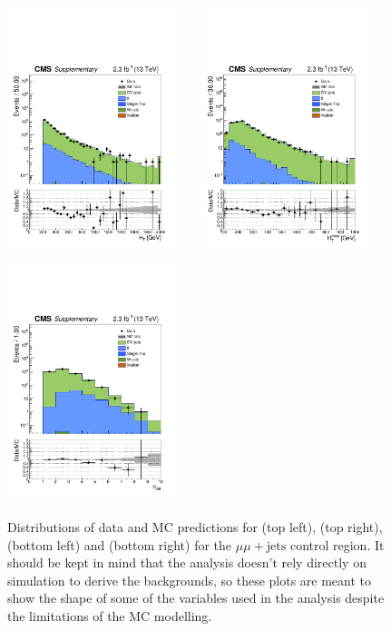 \clearpage
\begin{figure}[tbhp]
    \caption{ 
    Distributions of data and MC predictions for \scalht (top left), \mht (top right), \nj (bottom left) and \nb (bottom right) 
    for the $\mu\mu+\mathrm{jets}$ control region. 
    It should be kept in mind that the analysis doesn't rely directly on simulation to derive the backgrounds, 
    so these plots are meant to show the shape of some of the variables used in the analysis despite the limitations 
    of the MC modelling. 
    \label{fig:data-MC_plots_DoubleMu} }
  \begin{center}
     \includegraphics[width=0.45\textwidth]{figures/DoubleMu_ht40_all_all} ~~
     \includegraphics[width=0.45\textwidth]{figures/DoubleMu_mht40_pt_all_all} \\
     \includegraphics[width=0.45\textwidth]{figures/DoubleMu_nJet40_all_all} ~~

\end{center}
\end{figure}
